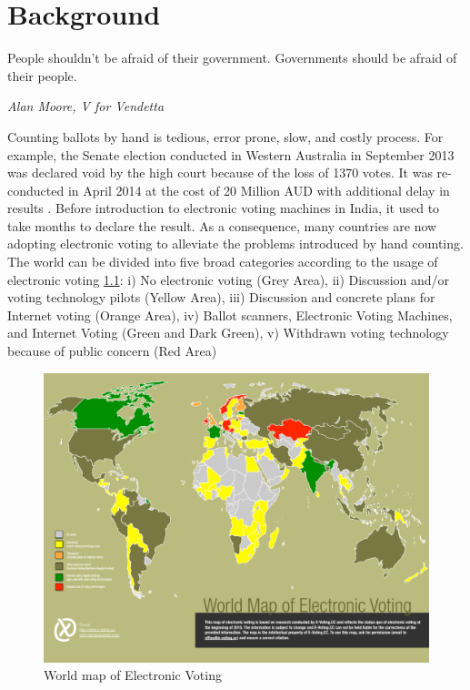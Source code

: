 \chapter{Background}
\label{cha:background}


\epigraph{People shouldn't be afraid of their government. Governments should be afraid of their people.} 
{\textit{Alan Moore, V for Vendetta }}
  Counting ballots by hand is tedious, error prone, slow, and costly process. 
  For example, the Senate election conducted in Western Australia in September 2013 was 
  declared void by the high court because of the loss of 1370 votes. It was 
  re-conducted in April 2014 at the cost of 20 Million 
  AUD with additional  delay in results \citep{Aussentate}. Before introduction to 
  electronic voting machines in India, it used to take months to declare the result.
  As a consequence, many countries 
  are now adopting electronic voting to alleviate the problems introduced by hand counting. 
  The world can be divided into five broad categories according to 
  the usage of electronic voting \citep{Evoting} \ref{fig:world_electronic_voting_map}: i) No electronic 
  voting (Grey Area), ii)
  Discussion and/or voting technology pilots (Yellow Area), 
  iii) Discussion and concrete plans for Internet voting (Orange Area),
  iv) Ballot scanners, Electronic Voting Machines, and Internet Voting (Green and Dark Green),
  v) Withdrawn voting technology because of public concern (Red Area) 
    \begin{figure}[!htb]
	\begin{center}
	\includegraphics[width=\textwidth,height=\textheight,keepaspectratio]{e-voting_worldmap_2015.pdf}
	\caption{World map of Electronic Voting}
	\label{fig:world_electronic_voting_map}
	\end{center}
  \end{figure}  
 
